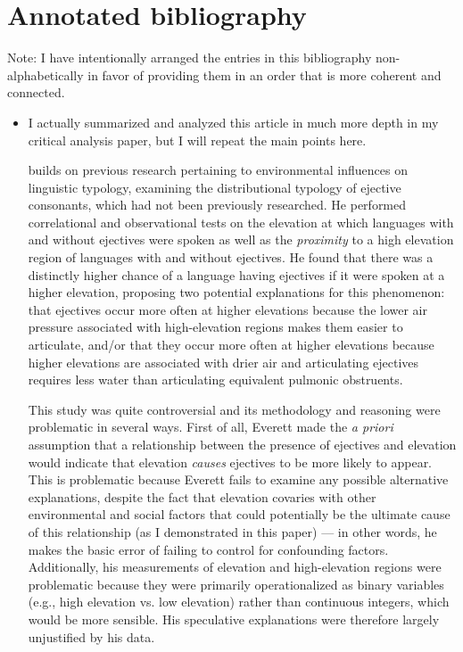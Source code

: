 \documentclass{article}
\begin{document}
\section{Annotated bibliography}
{\parindent0pt Note: I have intentionally arranged the entries in this bibliography non-alphabetically in favor of providing them in an order that is more coherent and connected.}\singlespacing
\begin{itemize}
\item \textbf{}

I actually summarized and analyzed this article in much more depth in my critical analysis paper, but I will repeat the main points here.

\textcite{everett2013} builds on previous research pertaining to environmental influences on linguistic typology, examining the distributional typology of ejective consonants, which had not been previously researched. He performed correlational and observational tests on the elevation at which languages with and without ejectives were spoken as well as the \emph{proximity} to a high elevation region of languages with and without ejectives. He found that there was a distinctly higher chance of a language having ejectives if it were spoken at a higher elevation, proposing two potential explanations for this phenomenon: that ejectives occur more often at higher elevations because the lower air pressure associated with high-elevation regions makes them easier to articulate, and/or that they occur more often at higher elevations because higher elevations are associated with drier air and articulating ejectives requires less water than articulating equivalent pulmonic obstruents. 

This study was quite controversial and its methodology and reasoning were problematic in several ways. First of all, Everett made the \emph{a priori} assumption that a relationship between the presence of ejectives and elevation would indicate that elevation \emph{causes} ejectives to be more likely to appear. This is problematic because Everett fails to examine any possible alternative explanations, despite the fact that elevation covaries with other environmental and social factors that could potentially be the ultimate cause of this relationship (as I demonstrated in this paper) --- in other words, he makes the basic error of failing to control for confounding factors. Additionally, his measurements of elevation and high-elevation regions were problematic because they were primarily operationalized as binary variables (e.g., high elevation vs. low elevation) rather than continuous integers, which would be more sensible. His speculative explanations were therefore largely unjustified by his data.


\end{itemize}
\end{document}

